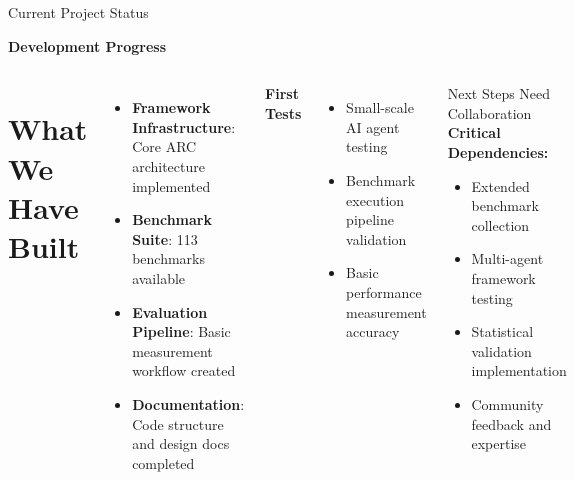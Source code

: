 \documentclass[compress,aspectratio=169]{beamer}
\begin{document}
\begin{frame}{Current Project Status}

    \textbf{Development Progress}
    \vspace{0.5em}
    
    \begin{columns}[t]
            \section*{What We Have Built}
            \scriptsize
            \begin{itemize}
                \item \textbf{Framework Infrastructure}: Core ARC architecture implemented
                \item \textbf{Benchmark Suite}: 113 benchmarks available
                \item \textbf{Evaluation Pipeline}: Basic measurement workflow created
                \item \textbf{Documentation}: Code structure and design docs completed
            \end{itemize}
            
            \vspace{0.5em}
            \textbf{First Tests}
            \scriptsize
            \begin{itemize}
                \item Small-scale AI agent testing
                \item Benchmark execution pipeline validation
                \item Basic performance measurement accuracy
            \end{itemize}

            \begin{block}{Next Steps Need Collaboration}
                \scriptsize
                \textbf{Critical Dependencies:}
                \begin{itemize}
                    \item Extended benchmark collection
                    \item Multi-agent framework testing
                    \item Statistical validation implementation
                    \item Community feedback and expertise
                \end{itemize}
            \end{block}
            

\end{columns}
\end{frame}
\end{document}
